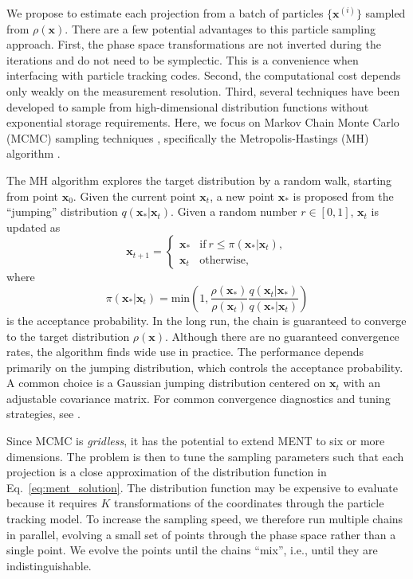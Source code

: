 \documentclass[%
    reprint,
    twocolumn,
    amsmath,
    amssymb,
    aps,
    prstab,
]{revtex4-2}
\begin{document}
We propose to estimate each projection from a batch of particles $\{\bm{x}^{(i)}\}$ sampled from $\rho(\bm{x})$. There are a few potential advantages to this particle sampling approach. First, the phase space transformations are not inverted during the iterations and do not need to be symplectic. This is a convenience when interfacing with particle tracking codes. Second, the computational cost depends only weakly on the measurement resolution. Third, several techniques have been developed to sample from high-dimensional distribution functions without exponential storage requirements. Here, we focus on Markov Chain Monte Carlo (MCMC) sampling techniques \cite{Gelman_1995}, specifically the Metropolis-Hastings (MH) algorithm \cite{Metropolis_1953}. 

The MH algorithm explores the target distribution by a random walk, starting from point $\bm{x}_0$. Given the current point $\bm{x}_t$, a new point $\bm{x}_*$ is proposed from the ``jumping'' distribution $q(\bm{x}_* | \bm{x}_t)$. Given a random number $r \in [0, 1]$, $\bm{x}_t$ is updated as
%
\begin{equation} \label{eq:metropolis-hastings}
    \bm{x}_{t + 1} = 
    \begin{cases}
        \bm{x}_*  & \text{if}\ r \leq \pi(\bm{x}_* | \bm{x}_t),  \\
        \bm{x}_t & \text{otherwise},
    \end{cases}
\end{equation}
%
where
%
\begin{equation}
    \pi(\bm{x}_* | \bm{x}_t) = 
    \text{min} 
    \left(
        1,
        \frac{ \rho(\bm{x}_*) }{ \rho(\bm{x}_t) }
        \frac{ q(\bm{x}_t | \bm{x}_*) }{ q(\bm{x}_* | \bm{x}_t) }
    \right)
\end{equation}
%
is the acceptance probability. In the long run, the chain is guaranteed to converge to the target distribution $\rho(\bm{x})$. Although there are no guaranteed convergence rates, the algorithm finds wide use in practice. The performance depends primarily on the jumping distribution, which controls the acceptance probability. A common choice is a Gaussian jumping distribution centered on $\bm{x}_t$ with an adjustable covariance matrix. For common convergence diagnostics and tuning strategies, see \cite{Gelman_1995}.

Since MCMC is \textit{gridless}, it has the potential to extend MENT to six or more dimensions. The problem is then to tune the sampling parameters such that each projection is a close approximation of the distribution function in Eq.~\eqref{eq:ment_solution}. The distribution function may be expensive to evaluate because it requires $K$ transformations of the coordinates through the particle tracking model. To increase the sampling speed, we therefore run multiple chains in parallel, evolving a small set of points through the phase space rather than a single point. We evolve the points until the chains ``mix'', i.e., until they are indistinguishable.
\end{document}
